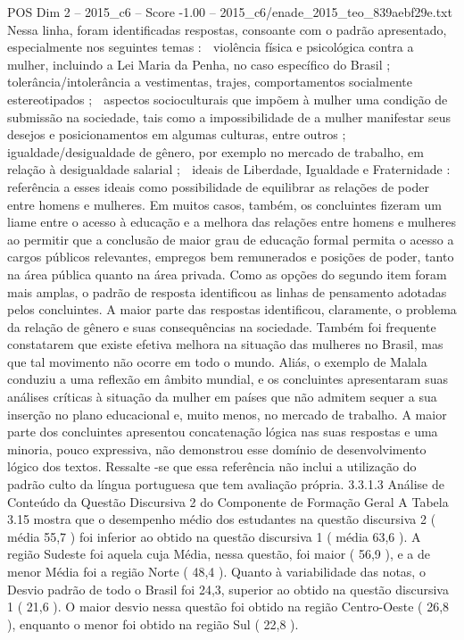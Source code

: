 \begin{textsample}{POS Dim 2 – 2015\_c6 – Score -1.00 – 2015\_c6/enade\_2015\_teo\_839aebf29e.txt}
Nessa linha, foram identificadas respostas, consoante com o padrão apresentado, especialmente nos seguintes temas :  violência física e psicológica contra a mulher, incluindo a Lei Maria da Penha, no caso específico do Brasil ;  tolerância/intolerância a vestimentas, trajes, comportamentos socialmente estereotipados ;  aspectos socioculturais que impõem à mulher uma condição de submissão na sociedade, tais como a impossibilidade de a mulher manifestar seus desejos e posicionamentos em algumas culturas, entre outros ;  igualdade/desigualdade de gênero, por exemplo no mercado de trabalho, em relação à desigualdade salarial ;  ideais de Liberdade, Igualdade e Fraternidade : referência a esses ideais como possibilidade de equilibrar as relações de poder entre homens e mulheres.
Em muitos casos, também, os concluintes fizeram um liame entre o acesso à educação e a melhora das relações entre homens e mulheres ao permitir que a conclusão de maior grau de educação formal permita o acesso a cargos públicos relevantes, empregos bem remunerados e posições de poder, tanto na área pública quanto na área privada.
Como as opções do segundo item foram mais amplas, o padrão de resposta identificou as linhas de pensamento adotadas pelos concluintes.
A maior parte das respostas identificou, claramente, o problema da relação de gênero e suas consequências na sociedade.
Também foi frequente constatarem que existe efetiva melhora na situação das mulheres no Brasil, mas que tal movimento não ocorre em todo o mundo.
Aliás, o exemplo de Malala conduziu a uma reflexão em âmbito mundial, e os concluintes apresentaram suas análises críticas à situação da mulher em países que não admitem sequer a sua inserção no plano educacional e, muito menos, no mercado de trabalho.
A maior parte dos concluintes apresentou concatenação lógica nas suas respostas e uma minoria, pouco expressiva, não demonstrou esse domínio de desenvolvimento lógico dos textos.
Ressalte -se que essa referência não inclui a utilização do padrão culto da língua portuguesa que tem avaliação própria. 3.3.1.3 Análise de Conteúdo da Questão Discursiva 2 do Componente de Formação Geral A Tabela 3.15 mostra que o desempenho médio dos estudantes na questão discursiva 2 ( média 55,7 ) foi inferior ao obtido na questão discursiva 1 ( média 63,6 ).
A região Sudeste foi aquela cuja Média, nessa questão, foi maior ( 56,9 ), e a de menor Média foi a região Norte ( 48,4 ).
Quanto à variabilidade das notas, o Desvio padrão de todo o Brasil foi 24,3, superior ao obtido na questão discursiva 1 ( 21,6 ).
O maior desvio nessa questão foi obtido na região Centro-Oeste ( 26,8 ), enquanto o menor foi obtido na região Sul ( 22,8 ).

\end{textsample}
